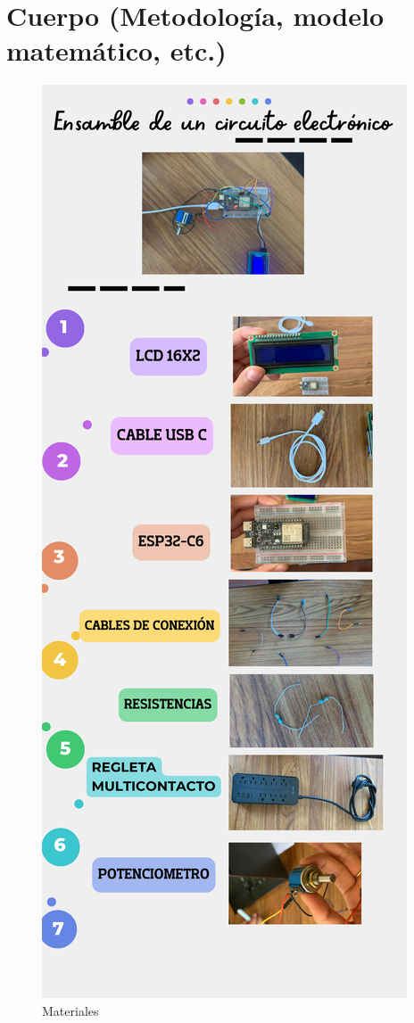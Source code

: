     \section{Cuerpo (Metodología, modelo matemático, etc.)}
    \begin{figure}[H]
        \centering
        \includegraphics[trim = {25mm 50mm 20mm 140mm},clip,scale=0.5]{16/Img/Materiales C.E .pdf}
        \caption{Materiales}
        \label{fig:Materiales}
    \end{figure}
